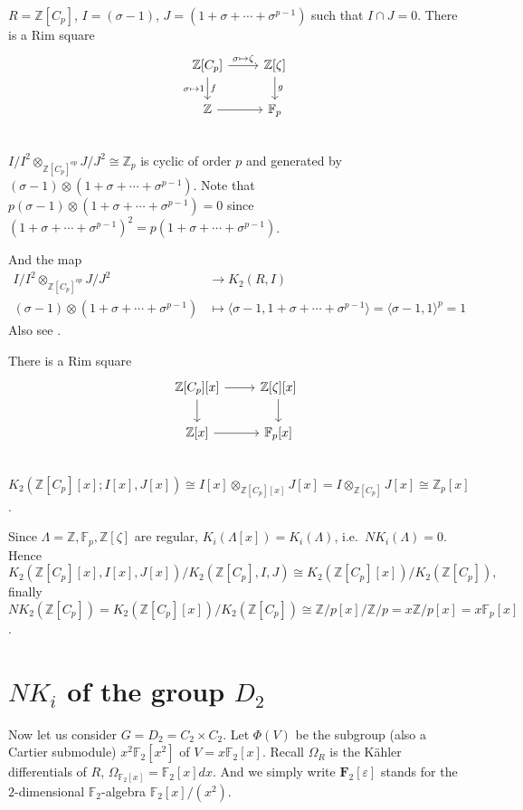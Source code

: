 \begin{example}[{$\mathbb{Z}[C_p]$}]
	$R=\mathbb{Z}[C_p]$, $I=(\sigma-1)$, $J=(1+\sigma+\cdots+\sigma^{p-1})$ such that $I\cap J =0$. There is a Rim square
		\[\begin{tikzcd}
			\mathbb{Z}[C_p] \ar[r,"\sigma \mapsto \zeta"] \ar[d,"f","\sigma\mapsto 1"']& \mathbb{Z}[\zeta]\ar[d,"g"]\\
			\mathbb{Z} \ar[r] & \mathbb{F}_p\\
		\end{tikzcd}\]
$I/I^2\otimes_{\mathbb{Z}[C_p]^{op}}J/J^2 \cong \mathbb{Z}_p$ is cyclic of order $p$ and generated by $(\sigma-1)\otimes(1+\sigma+\cdots+\sigma^{p-1})$. Note that $p(\sigma-1)\otimes(1+\sigma+\cdots+\sigma^{p-1})=0$ since $(1+\sigma+\cdots+\sigma^{p-1})^2=p(1+\sigma+\cdots+\sigma^{p-1})$.

And the map 
\begin{align*}
I/I^2\otimes_{\mathbb{Z}[C_p]^{op}}J/J^2 &\longrightarrow K_2(R,I)\\
(\sigma-1)\otimes(1+\sigma+\cdots+\sigma^{p-1}) & \mapsto \langle \sigma-1,1+\sigma+\cdots+\sigma^{p-1} \rangle =\langle \sigma-1,1\rangle^p=1
\end{align*}
Also see \cite{STEIN1980213}.

\end{example}
\begin{example}[{$\mathbb{Z}[C_p][x]$}]
	There is a Rim square
		\[\begin{tikzcd}
			\mathbb{Z}[C_p][x] \ar[r] \ar[d]& \mathbb{Z}[\zeta][x]\ar[d]\\
			\mathbb{Z}[x] \ar[r] & \mathbb{F}_p[x]\\
		\end{tikzcd}\]
$K_2(\mathbb{Z}[C_p][x];I[x],J[x])\cong I[x]\otimes_{\mathbb{Z}[C_p][x]} J[x] =I\otimes_{\mathbb{Z}[C_p]} J[x]\cong \mathbb{Z}_p[x]$.

Since $\Lambda=\mathbb{Z}, \mathbb{F}_p, \mathbb{Z}[\zeta]$ are regular, $K_i(\Lambda[x]) = K_i(\Lambda)$, i.e.\ $NK_i(\Lambda)=0$. Hence 
\[K_2(\mathbb{Z}[C_p][x],I[x],J[x])/K_2(\mathbb{Z}[C_p],I,J)\cong K_2(\mathbb{Z}[C_p][x])/K_2(\mathbb{Z}[C_p]),\]
finally $NK_2(\mathbb{Z}[C_p]) = K_2(\mathbb{Z}[C_p][x])/K_2(\mathbb{Z}[C_p]) \cong \mathbb{Z}/p[x]/\mathbb{Z}/p=x \mathbb{Z}/p [x]= x \mathbb{F}_p[x]$.
\end{example}
\section{\texorpdfstring{$NK_i$}{NKi} of the group \texorpdfstring{$D_2$}{D2}}
\label{sec:D2}
Now let us consider $G=D_2=C_2\times C_2$. Let $\Phi (V)$ be the subgroup (also a Cartier submodule) $x^2 \mathbb{F}_2[x^2]$ of $V=x \mathbb{F}_2[x]$. Recall $\Omega_R$ is the K\"{a}hler differentials of $R$, $\Omega_{\mathbb{F}_2[x]}=\mathbb{F}_2[x]dx$. And we simply write $\mathbf{F}_2[\varepsilon]$ stands for the $2$-dimensional $\mathbb{F}_2$-algebra $\mathbb{F}_2[x]/(x^2)$.


